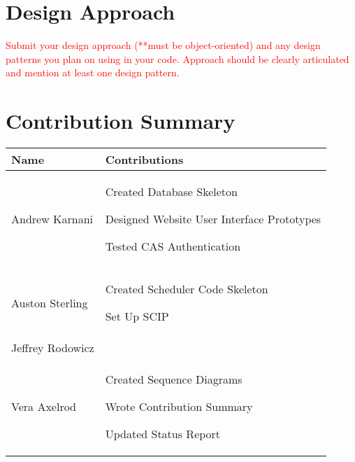 \documentclass[11pt]{article}
\newenvironment{packed_itemize}{
\begin{itemize}
  \setlength{\itemsep}{1pt}
  \setlength{\parskip}{0pt}
  \setlength{\parsep}{0pt}
}{\end{itemize}}
\begin{document}
\section*{ Design Approach}  %
\textcolor{red}{
Submit your design approach (**must be object-oriented) and any design patterns you plan on using in your code. Approach should be clearly articulated and mention at least one design pattern.}


\section{Contribution Summary} %
\begin{tabular}{|m{1.4in}|m{4in}|}
\hline 
\textbf{\large Name}     & \textbf{\large Contributions} \\
\hline\hline

 Andrew Karnani
	&
	 \begin{packed_itemize}
		\item Created Database Skeleton
		\item Designed Website User Interface Prototypes
		\item Tested CAS Authentication
	\end{packed_itemize}
\\
\hline
 Auston Sterling
	&
	 \begin{packed_itemize}
	        \item Created Scheduler Code Skeleton
		  \item Set Up SCIP
	\end{packed_itemize}
\\
\hline
Jeffrey Rodowicz
	&
	 \begin{packed_itemize}
		\item 
	\end{packed_itemize}
\\
\hline
Vera Axelrod
	&
	 \begin{packed_itemize}
		\item Created Sequence Diagrams
		\item Wrote Contribution Summary
		\item Updated Status Report
	\end{packed_itemize}
\\
\hline
\end{tabular}

\end{document}
